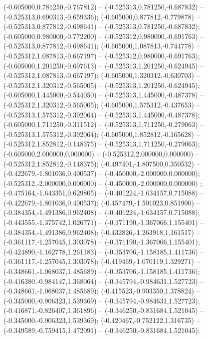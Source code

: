  (-0.605000,0.781250,-0.767812) -- (-0.525313,0.781250,-0.687832) -- (-0.525313,0.690313,-0.659336);
 (-0.605000,0.877812,-0.779878) -- (-0.525313,0.877812,-0.698641) -- (-0.525313,0.781250,-0.687832);
 (-0.605000,0.980000,-0.772200) -- (-0.525312,0.980000,-0.691763) -- (-0.525313,0.877812,-0.698641);
 (-0.605000,1.087813,-0.744778) -- (-0.525312,1.087813,-0.667197) -- (-0.525312,0.980000,-0.691763);
 (-0.605000,1.201250,-0.697613) -- (-0.525313,1.201250,-0.624945) -- (-0.525312,1.087813,-0.667197);
 (-0.605000,1.320312,-0.630703) -- (-0.525312,1.320312,-0.565005) -- (-0.525313,1.201250,-0.624945);
 (-0.605000,1.445000,-0.544050) -- (-0.525313,1.445000,-0.487378) -- (-0.525312,1.320312,-0.565005);
 (-0.605000,1.575312,-0.437653) -- (-0.525313,1.575312,-0.392064) -- (-0.525313,1.445000,-0.487378);
 (-0.605000,1.711250,-0.311512) -- (-0.525313,1.711250,-0.279063) -- (-0.525313,1.575312,-0.392064);
 (-0.605000,1.852812,-0.165628) -- (-0.525312,1.852812,-0.148375) -- (-0.525313,1.711250,-0.279063);
 (-0.605000,2.000000,0.000000) -- (-0.525312,2.000000,0.000000) -- (-0.525312,1.852812,-0.148375);
 (-0.497401,-1.807500,0.350532) -- (-0.422679,-1.801036,0.400537) -- (-0.450000,-2.000000,0.000000);
 (-0.525312,-2.000000,0.000000) -- (-0.450000,-2.000000,0.000000) ;
 (-0.475164,-1.643351,0.629805) -- (-0.401224,-1.634157,0.715088) -- (-0.422679,-1.801036,0.400537);
 (-0.457479,-1.501023,0.851900) -- (-0.384354,-1.491386,0.962408) -- (-0.401224,-1.634157,0.715088);
 (-0.443555,-1.375742,1.026771) -- (-0.371190,-1.367066,1.155401) -- (-0.384354,-1.491386,0.962408);
 (-0.432826,-1.263918,1.161517) -- (-0.361117,-1.257045,1.303078) -- (-0.371190,-1.367066,1.155401);
 (-0.424890,-1.162778,1.261183) -- (-0.353706,-1.158185,1.411736) -- (-0.361117,-1.257045,1.303078);
 (-0.419469,-1.070119,1.329271) -- (-0.348661,-1.068037,1.485689) -- (-0.353706,-1.158185,1.411736);
 (-0.416380,-0.984147,1.368064) -- (-0.345794,-0.984631,1.527723) -- (-0.348661,-1.068037,1.485689);
 (-0.415523,-0.903350,1.378824) -- (-0.345000,-0.906323,1.539369) -- (-0.345794,-0.984631,1.527723);
 (-0.416871,-0.826407,1.361896) -- (-0.346250,-0.831684,1.521045) -- (-0.345000,-0.906323,1.539369);
 (-0.420467,-0.752122,1.316735) -- (-0.349589,-0.759415,1.472091) -- (-0.346250,-0.831684,1.521045);
